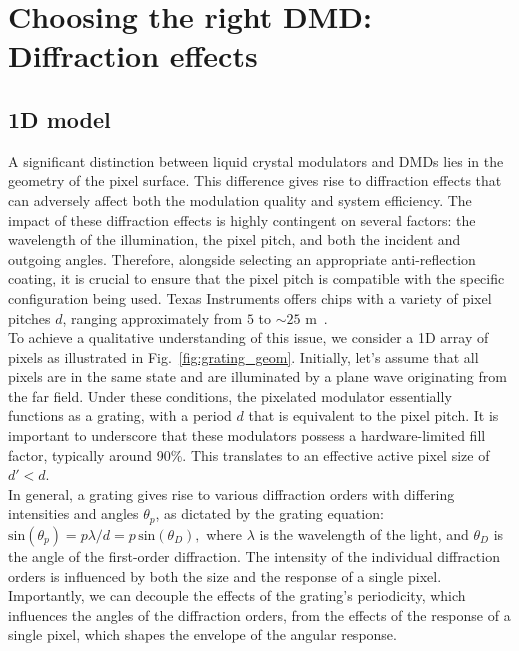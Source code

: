 \documentclass[12pt]{iopart}
\begin{document}
\section{Choosing the right DMD: Diffraction effects}

\subsection{1D model}

A significant distinction between liquid crystal modulators and DMDs
lies in the geometry of the pixel surface.
This difference gives rise to diffraction effects that can adversely affect
both the modulation quality and system efficiency.
The impact of these diffraction effects is highly contingent on several factors:
the wavelength of the illumination, the pixel pitch, and both the incident and outgoing angles.
Therefore, alongside selecting an appropriate anti-reflection coating,
it is crucial to ensure that the pixel pitch is compatible with the specific configuration being used.
Texas Instruments offers chips with a variety of pixel pitches $d$,
ranging approximately from $5$ to $\sim25$ \textmu m~\cite{TI}.\\


To achieve a qualitative understanding of this issue,
we consider a 1D array of pixels as illustrated in Fig.~\ref{fig:grating_geom}.
Initially, let's assume that all pixels are in the same state and are illuminated by a plane wave originating from the far field.
Under these conditions, the pixelated modulator essentially functions as a grating,
with a period $d$ that is equivalent to the pixel pitch.
It is important to underscore that these modulators possess a hardware-limited fill factor,
typically around 90\%.
This translates to an effective active pixel size of $d' < d$.\\

In general, a grating gives rise to various diffraction orders
with differing intensities
and angles $\theta_p$, as dictated by the grating equation:
$
  \text{sin}(\theta_p) = p\lambda/d = p \, \text{sin}(\theta_D),
$
where $\lambda$ is the wavelength of the light,
and $\theta_D$ is the angle of the first-order diffraction.
The intensity of the individual diffraction orders is influenced by both the size and the response of a single pixel.
Importantly, we can decouple the effects of the grating's periodicity,
which influences the angles of the diffraction orders,
from the effects of the response of a single pixel,
which shapes the envelope of the angular response.\\
\end{document}
